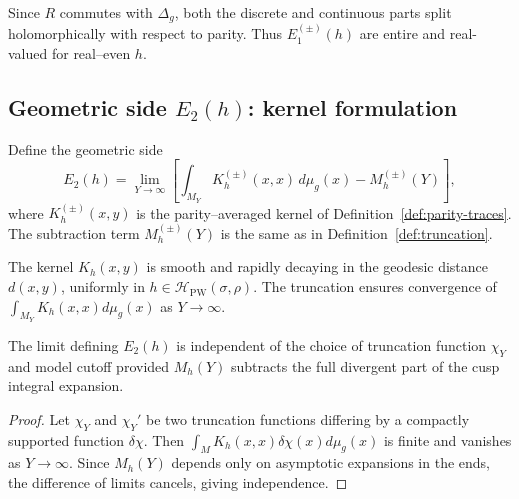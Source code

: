 \begin{remark}
\label{rem:parity-holo}
Since $R$ commutes with $\Delta_g$, both the discrete and continuous parts split holomorphically with respect to parity.  
Thus $E_1^{(\pm)}(h)$ are entire and real-valued for real–even $h$. %
\end{remark}

\subsection{Geometric side $E_2(h)$: kernel formulation}
\label{subsec:ch6-part3-geometric-side} \relax

\begin{definition}
\label{def:E2}
Define the geometric side
\[
E_2(h)
=\lim_{Y\to\infty}\left[\int_{M_Y}K_h^{(\pm)}(x,x)\,d\mu_g(x)-M_h^{(\pm)}(Y)\right],
\]
where $K_h^{(\pm)}(x,y)$ is the parity–averaged kernel of Definition~\ref{def:parity-traces}.  
The subtraction term $M_h^{(\pm)}(Y)$ is the same as in Definition~\ref{def:truncation}. %
\end{definition}

\begin{remark}
\label{rem:kernel-conv}
The kernel $K_h(x,y)$ is smooth and rapidly decaying in the geodesic distance $d(x,y)$, uniformly in $h\in\mathcal{H}_{\mathrm{PW}}(\sigma,\rho)$.  
The truncation ensures convergence of $\int_{M_Y}K_h(x,x)d\mu_g(x)$ as $Y\to\infty$. %
\end{remark}

\begin{lemma}
\label{lem:indep}
The limit defining $E_2(h)$ is independent of the choice of truncation function $\chi_Y$ and model cutoff provided $M_h(Y)$ subtracts the full divergent part of the cusp integral expansion. %
\end{lemma}

\begin{proof}
Let $\chi_Y$ and $\chi_Y'$ be two truncation functions differing by a compactly supported function $\delta\chi$.  
Then $\int_M K_h(x,x)\delta\chi(x)d\mu_g(x)$ is finite and vanishes as $Y\to\infty$.  
Since $M_h(Y)$ depends only on asymptotic expansions in the ends, the difference of limits cancels, giving independence. %
\end{proof}


